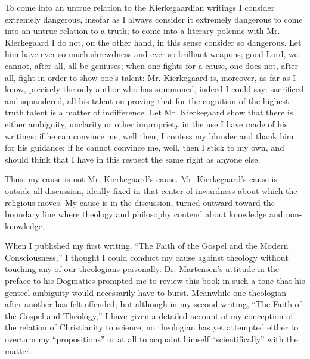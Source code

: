 \documentclass[12pt,a4paper,openany]{book}
\newcommand{\opage}[1]{\marginnote{\footnotesize\textit{[#1]}}}
\begin{document}
To come into an untrue relation to the Kierkegaardian
writings I consider extremely dangerous, insofar as I always
consider it extremely dangerous to come into an untrue relation
to a truth; to come into a literary polemic with Mr.
Kierkegaard I do not, on the other hand, in this sense consider
so dangerous. Let him have ever so much shrewdness and ever so
brilliant weapons; good Lord, we cannot, after all, all be geniuses;
when one fights for a cause, one does not, after all, fight in order
to show one's talent: Mr. Kierkegaard is, moreover, as far as I
know, precisely the only author who has summoned, indeed I could
say: sacrificed and squandered, all his talent on proving that for
the cognition of the highest truth talent is a matter of
\setcounter{footnote}{0}%
\opage{75}indifference. Let Mr. Kierkegaard show that there is either
ambiguity, unclarity or other impropriety in the use
I have made of his writings: if he can convince me,
well then, I confess my blunder and thank him for his
guidance; if he cannot convince me, well, then I stick
to my own, and should think that I have in this respect the same
right as anyone else.

Thus: my cause is not Mr. Kierkegaard's cause.
Mr. Kierkegaard's cause is outside all discussion, ideally
fixed in that center of inwardness about which the religious
moves. My cause is in the discussion, turned outward
toward the boundary line where theology and philosophy
contend about knowledge and non-knowledge.

When I published my first writing, ``The Faith of the Gospel and
the Modern Consciousness,'' I thought I could conduct my
cause against theology without touching any of our theologians
personally. Dr. Martensen's attitude in the preface to
his Dogmatics prompted me to review this book
in such a tone that his genteel ambiguity would necessarily
have to burst. Meanwhile one theologian after another has felt
offended; but although in my
second writing, ``The Faith of the Gospel and Theology,'' I have given a detailed
account of my conception of the relation of Christianity
to science, no theologian has yet attempted either
to overturn my ``propositions'' or at all to acquaint himself
``scientifically'' with the matter.
\end{document}
